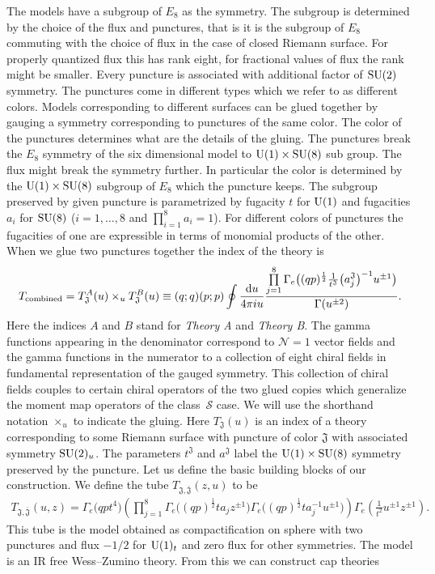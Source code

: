 \documentclass[a4paper,12pt]{article}
\begin{document}
\allowdisplaybreaks
The models have a subgroup of $E_8$ as the symmetry. The subgroup is determined by the choice of the flux and punctures, that is it is the subgroup of $E_8$ commuting with the choice of flux in the case of closed Riemann surface. For properly quantized flux this has rank eight, for fractional values of flux the rank might be smaller. Every puncture is associated with additional factor of ${\rm SU}(2)$ symmetry. The punctures come in different types which we refer to as different colors.
Models corresponding to different surfaces can be glued together by gauging a symmetry corresponding to punctures of the same color. The color of the punctures determines what are the details of the gluing. The punctures break the $E_8$ symmetry of the six dimensional model to ${\rm U}(1)\times {\rm SU}(8)$ sub group. The flux might break the symmetry further. In particular the color is determined by the ${\rm U}(1)\times {\rm SU}(8)$ subgroup of $E_8$ which the puncture keeps. The subgroup preserved by given puncture is parametrized by fugacity $t$ for ${\rm U}(1)$ and fugacities $a_i$ for ${\rm SU}(8)$ ($i=1,\dots, 8$ and $\prod\limits_{i=1}^8 a_i=1$). For different colors of punctures the fugacities of one are expressible in terms of monomial products of the other. When we glue two punctures together the index of the theory is
\begin{gather*}
T_{\rm combined}=T_{\mathfrak J}^{A}(u)\times_u T_{\mathfrak J}^{B}(u)\equiv (q;q)(p;p)\oint\frac{{\rm d}u}{4\pi i u} \frac{\prod\limits_{j=1}^8\Gamma_e\big((q p)^{\frac12 }\frac1{t^{\mathfrak J}} \big(a^{\mathfrak J}_j\big)^{-1} u^{\pm1}\big)}{\Gamma(u^{\pm2})} .
\end{gather*}
Here the indices $A$ and $B$ stand for {\it Theory A} and {\it Theory B}. The gamma functions appearing in the denominator correspond to ${\mathcal N}=1$ vector fields and the gamma functions in the numerator to a collection of eight chiral fields in fundamental representation of the gauged symmetry. This collection of chiral fields couples to certain chiral operators of the two glued copies which generalize the moment map operators of the class~${\mathcal S}$ case.
We will use the shorthand notation $\times_u$ to indicate the gluing. Here $T_{\mathfrak J}(u)$ is an index of a theory corresponding to some Riemann surface with puncture of color ${\mathfrak J}$ with associated symmetry ${\rm SU}(2)_u$. The parameters $t^{\mathfrak J}$ and $a^{\mathfrak J}$ label the ${\rm U}(1)\times {\rm SU}(8)$ symmetry preserved by the puncture.
Let us define the basic building blocks of our construction. We define the tube $T_{{\mathfrak J},\overline{\mathfrak J}}(z,u)$ to be
\begin{gather*}
T_{{\mathfrak J},\overline{\mathfrak J}}(u,z)=\Gamma_e\big(q p t^4\big)\left(\prod_{j=1}^8\Gamma_e\big((q p)^{\frac12}t a_j z^{\pm1}\big)\Gamma_e\big(( q p)^{\frac12} t a_j^{-1} u^{\pm1}\big)\right)\Gamma_e\left(\frac1{t^2}u^{\pm1}z^{\pm1}\right) .
\end{gather*}
This tube is the model obtained as compactification on sphere with two punctures and flux $-1/2$ for ${\rm U}(1)_t$ and zero flux for other symmetries. The model is an IR free Wess--Zumino theory. From this we can construct cap theories
\end{document}
